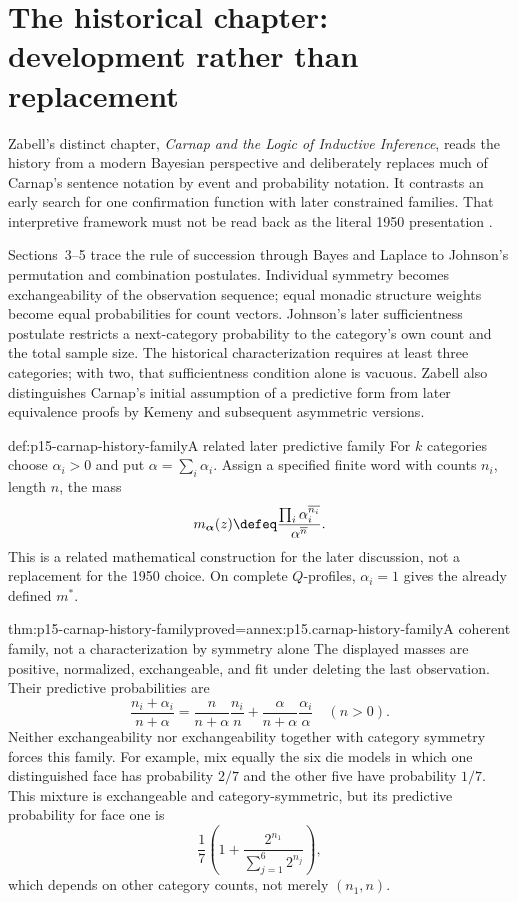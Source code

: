 \section{The historical chapter: development rather than replacement}
\label{sec:p15-carnap-history}

Zabell's distinct chapter, \emph{Carnap and the Logic of Inductive
Inference}, reads the history from a modern Bayesian perspective and
deliberately replaces much of Carnap's sentence notation by event and
probability notation. It contrasts an early search for one confirmation
function with later constrained families. That interpretive framework
must not be read back as the literal 1950 presentation
\cite[secs.~1--2, 13]{Zabell2011CarnapInductiveInference}.

Sections~3--5 trace the rule of succession through Bayes and Laplace to
Johnson's permutation and combination postulates. Individual symmetry
becomes exchangeability of the observation sequence; equal monadic
structure weights become equal probabilities for count vectors.
Johnson's later sufficientness postulate restricts a next-category
probability to the category's own count and the total sample size.
The historical characterization requires at least three categories;
with two, that sufficientness condition alone is vacuous. Zabell also
distinguishes Carnap's initial assumption of a predictive form from later
equivalence proofs by Kemeny and subsequent asymmetric versions.

\begin{hbdefinition}{def:p15-carnap-history-family}{A related later predictive family}
For \(k\) categories choose \(\alpha_i>0\) and put
\(\alpha=\sum_i\alpha_i\). Assign a specified finite word with
counts \(n_i\), length \(n\), the mass
\[
 m_{\boldsymbol\alpha}(z)\defeq
 \frac{\prod_i\alpha_i^{\overline{n_i}}}{\alpha^{\overline n}}.
\]
This is a related mathematical construction for the later discussion,
not a replacement for the 1950 choice. On complete \(Q\)-profiles,
\(\alpha_i=1\) gives the already defined \(m^*\).
\end{hbdefinition}

\begin{hbtheorem}{thm:p15-carnap-history-family}{proved=annex:p15.carnap-history-family}{A coherent family, not a characterization by symmetry alone}
The displayed masses are positive, normalized, exchangeable, and fit
under deleting the last observation. Their predictive probabilities are
\[
 \frac{n_i+\alpha_i}{n+\alpha}
 =\frac n{n+\alpha}\frac{n_i}{n}
  +\frac\alpha{n+\alpha}\frac{\alpha_i}{\alpha}\quad(n>0).
\]
Neither exchangeability nor exchangeability together with category
symmetry forces this family. For example, mix equally the six die
models in which one distinguished face has probability \(2/7\) and
the other five have probability \(1/7\). This mixture is exchangeable
and category-symmetric, but its predictive probability for face one is
\[
 \frac17\left(1+\frac{2^{n_1}}{\sum_{j=1}^6 2^{n_j}}\right),
\]
which depends on other category counts, not merely \((n_1,n)\).
\end{hbtheorem}

